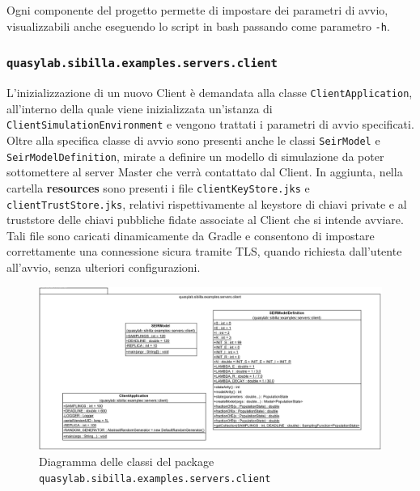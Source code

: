 Ogni componente del progetto permette di impostare dei parametri di avvio, visualizzabili anche eseguendo lo script in bash passando come parametro \texttt{-h}.

\subsubsection{\texttt{quasylab.sibilla.examples.servers.client}}

L'inizializzazione di un nuovo Client è demandata alla classe \texttt{ClientApplication}, all'interno della quale viene inizializzata un'istanza di \texttt{ClientSimulationEnvironment} e vengono trattati i parametri di avvio specificati.
Oltre alla specifica classe di avvio sono presenti anche le classi \texttt{SeirModel} e \texttt{SeirModelDefinition}, mirate a definire un modello di simulazione da poter sottomettere al server Master che verrà contattato dal Client.
In aggiunta, nella cartella \textbf{resources} sono presenti i file \texttt{clientKeyStore.jks} e \texttt{clientTrustStore.jks}, relativi rispettivamente al keystore di chiavi private e al truststore delle chiavi pubbliche fidate associate al Client che si intende avviare. Tali file sono caricati dinamicamente da Gradle e consentono di impostare correttamente una connessione sicura tramite TLS, quando richiesta dall'utente all'avvio, senza ulteriori configurazioni.

\begin{figure}[H]
    \includegraphics[width=\linewidth]{images/quasylab.sibilla.examples.servers.client.png}
    \captionsetup{justification=centering}
    \caption{Diagramma delle classi del package \texttt{quasylab.sibilla.examples.servers.client}}
  \end{figure}

